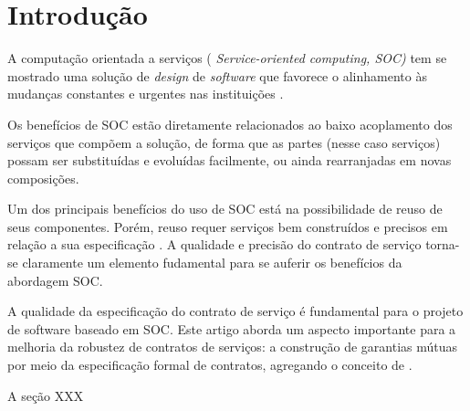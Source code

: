 \section{Introdução}
\label{Introducao}

A computação orientada a serviços ( \emph{Service-oriented computing, SOC)} tem
se mostrado uma solução de \textit{design} de \textit{software} que favorece o
alinhamento às mudanças constantes e urgentes nas instituições
\cite{chen2008towards}. 

Os benefícios de SOC estão diretamente relacionados ao
baixo acoplamento dos serviços que compõem a solução, de forma que as partes
(nesse caso serviços) possam ser subs\-ti\-tu\-í\-das e evoluídas facilmente, ou
ainda rearranjadas em novas composições. 

Um dos principais benefícios do uso de SOC está na possibilidade de reuso de
seus componentes. Porém, reuso requer serviços bem construídos e precisos em
relação a sua especificação \cite{jazequel1997design}. A qualidade e precisão do
contrato de serviço torna-se claramente um elemento fudamental para se auferir
os benefícios da abordagem SOC.

A qualidade da especificação do contrato de serviço é fundamental para o
projeto de software baseado em SOC. Este artigo aborda um aspecto
importante para a melhoria da robustez de contratos de serviços: a construção de
garantias mútuas por meio da especificação formal de contratos, agregando o
conceito de \designbycontract{}.

A seção XXX



